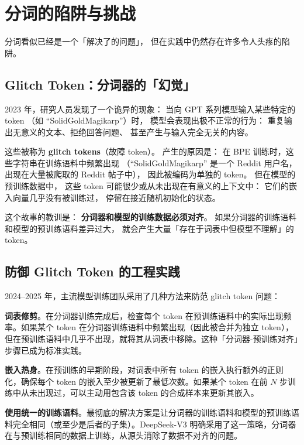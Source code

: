 \section{分词的陷阱与挑战}

分词看似已经是一个「解决了的问题」，
但在实践中仍然存在许多令人头疼的陷阱。

\subsection{Glitch Token：分词器的「幻觉」}

2023 年，研究人员发现了一个诡异的现象：
当向 GPT 系列模型输入某些特定的 token
（如 “SolidGoldMagikarp”）时，
模型会表现出极不正常的行为：
重复输出无意义的文本、拒绝回答问题、
甚至产生与输入完全无关的内容。

这些被称为 \textbf{glitch tokens}（故障 token）。
产生的原因是：
在 BPE 训练时，这些字符串在训练语料中频繁出现
（“SolidGoldMagikarp” 是一个 Reddit 用户名，
出现在大量被爬取的 Reddit 帖子中），
因此被编码为单独的 token。
但在模型的预训练数据中，
这些 token 可能很少或从未出现在有意义的上下文中：
它们的嵌入向量几乎没有被训练过，
停留在接近随机初始化的状态。

这个故事的教训是：
\textbf{分词器和模型的训练数据必须对齐}。
如果分词器的训练语料和模型的预训练语料差异过大，
就会产生大量「存在于词表中但模型不理解」的 token。

\subsection{防御 Glitch Token 的工程实践}

2024--2025 年，主流模型训练团队采用了几种方法来防范 glitch token 问题：

\textbf{词表修剪}。在分词器训练完成后，检查每个 token 在预训练语料中的实际出现频率。如果某个 token 在分词器训练语料中频繁出现（因此被合并为独立 token），但在预训练语料中几乎不出现，就将其从词表中移除。这种「分词器-预训练对齐」步骤已成为标准实践。

\textbf{嵌入热身}。在预训练的早期阶段，对词表中所有 token 的嵌入执行额外的正则化，确保每个 token 的嵌入至少被更新了最低次数。如果某个 token 在前 $N$ 步训练中从未出现过，可以主动用包含该 token 的合成样本来更新其嵌入。

\textbf{使用统一的训练语料}。最彻底的解决方案是让分词器的训练语料和模型的预训练语料完全相同（或至少是后者的子集）。DeepSeek-V3 明确采用了这一策略，分词器在与预训练相同的数据上训练，从源头消除了数据不对齐的问题。

